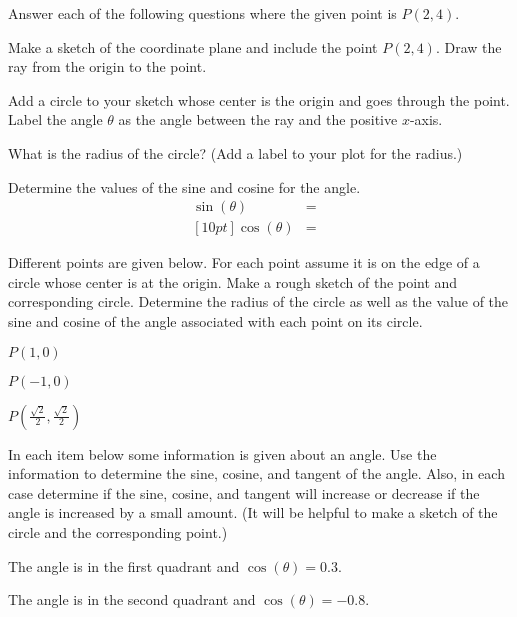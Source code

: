 \begin{problem}
\item Answer each of the following questions where the given point is $P(2,4)$.
  \begin{subproblem}
  \item Make a sketch of the coordinate plane and include the point
    $P(2,4)$. Draw the ray from the origin to the point.
    \vfill
  \item Add a circle to your sketch whose center is the origin and goes
    through the point. Label the angle $\theta$ as the angle between
    the ray and the positive $x$-axis.
  \item What is the radius of the circle? (Add a label to your plot for the radius.)
    \vspace{2em}
  \item Determine the values of the sine and cosine for the angle.
    \begin{eqnarray*}
      \sin(\theta) & = & \\ [10pt]
      \cos(\theta) & = &
    \end{eqnarray*}
  \end{subproblem}

\clearpage

\item Different points are given below. For each point assume it is
  on the edge of a circle whose center is at the origin.
  Make a rough sketch of the point and corresponding circle.
  Determine the radius of the circle as well as the value of the
  sine and cosine of the angle associated with each point on its circle.
  \begin{subproblem}
  \item $P(1,0)$
    \vfill
  \item $P(-1,0)$
    \vfill
  \item $P\left(\frac{\sqrt{2}}{2},\frac{\sqrt{2}}{2}\right)$
    \vfill
  \end{subproblem}

\clearpage

\item In each item below some information is given about an angle.
  Use the information to determine the sine, cosine, and tangent of
  the angle. Also, in each case determine if the sine, cosine, and
  tangent will increase or decrease if the angle is increased by a
  small amount. (It will be helpful to make a sketch of the circle and
  the corresponding point.)
  \begin{subproblem}
    \item The angle is in the first quadrant and $\cos(\theta)=0.3$.
      \vfill
    \item The angle is in the second quadrant and $\cos(\theta)=-0.8$.
      \vfill
  \end{subproblem}


\end{problem}
